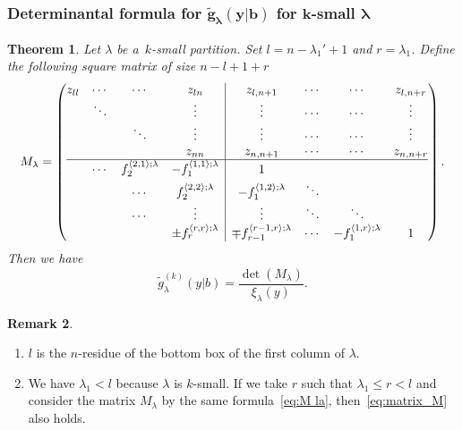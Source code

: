 \documentclass[pdftex]{sigma}
\numberwithin{equation}{section}
\newcommand{\bl}{\mathbf{l}}
\newcommand{\co}{\xi}
\newcommand{\la}{\lambda}
\newcommand{\ha}{f}
\newtheorem{Theorem}{Theorem}[section]
\theoremstyle{definition}
\newtheorem{Remark}[Theorem]{Remark}
\begin{document}
\subsubsection[Determinantal formula for g\_la(y|b) for k-small la]{Determinantal formula for $\boldsymbol{\tilde{g}_\la(y|b)}$ for $\boldsymbol{k}$-small $\boldsymbol{\la}$}


\begin{Theorem}\label{thm:determinant_formula_for_ksmall_g}
Let $\lambda$ be a~$k$-small partition.
Set $
l=n-\la_1'+1$
and $r=\la_1$.
Define the following
square matrix of size $n-l+1+r$
\begin{equation}\label{eq:M la}
 M_\la=
 \left(
\begin{array}{@{}cccc|cccc@{}}
 z_{ll}&\cdots &\cdots &z_{ln}&z_{l,n+1}&\cdots&\cdots&z_{l,n+r}\\
 &\ddots& &\vdots&\vdots&\cdots&\cdots&\vdots\\
 &&\ddots &\vdots&\vdots&\cdots&\cdots&\vdots\\
 & &&z_{nn}&z_{n,n+1}&\cdots&\cdots&z_{n,n+r}\\ \hline
 &\cdots
 & \ha_2^{\langle {2,1}\rangle;\la} & -\ha_1^{\langle 1,1\rangle;\la} & 1 & & \\
 &&\cdots
 &\ha_2^{\langle 2,2\rangle;\la}&-\ha_1^{\langle 1,2\rangle;\la} & \ddots &&\\
 &&\cdots&\vdots&\vdots & \ddots &\ddots&\\
 &&&\pm \ha_r^{\langle r,r\rangle;\la}&\mp \ha_{r-1}^{\langle r-1,r\rangle;\la}&\cdots &-\ha_1^{\langle 1,r\rangle;\la} &1
\end{array}
\right).
\end{equation}
Then we have
\begin{equation}\label{eq:matrix_M}
\tilde{g}^{(k)}_{\lambda}(y|b)=
\frac{\det(M_\lambda)}{\co_\la(y)}.
\end{equation}
\end{Theorem}


\begin{Remark}\quad
\begin{enumerate}
\itemsep=0pt
\item[(1)] $l$ is the $n$-residue of the bottom box of the first column of $\la$.
 \item[(2)] We have $\la_1<l$ because $\la$ is $k$-small.
If we take $r$ such that $\la_1\le r<l$ and
 consider the matrix $M_\la$ by the same formula~\eqref{eq:M la},
 then~\eqref{eq:matrix_M} also holds.
\end{enumerate}

\end{Remark}
\end{document}
